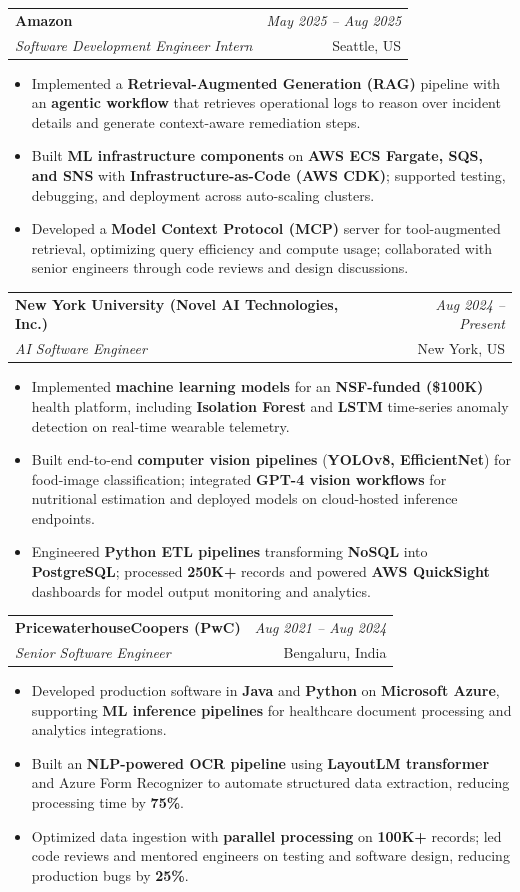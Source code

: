 \documentclass[a4paper,10pt]{article}
\makeatletter
\newcommand{\resumeSubheading}[4]{
\vspace{0.3mm}\item
    \begin{tabular*}{0.98\textwidth}[t]{l@{\extracolsep{\fill}}r}
        \textbf{#1} & \textit{\footnotesize{#4}} \\
        \textit{\footnotesize{#3}} & \footnotesize{#2}\\
    \end{tabular*}\vspace{-2mm}
}
\newcommand{\resumeItemListStart}{\begin{itemize}[leftmargin=*, labelsep=1mm, itemsep=0pt]}
\newcommand{\resumeItemListEnd}{\end{itemize}\vspace{-2mm}}
\makeatother
\begin{document}
\resumeSubheading
{Amazon}{Seattle, US}
{Software Development Engineer Intern}{May 2025 -- Aug 2025}
\resumeItemListStart
\item \footnotesize{Implemented a \textbf{Retrieval-Augmented Generation (RAG)} pipeline with an \textbf{agentic workflow} that retrieves operational logs to reason over incident details and generate context-aware remediation steps.}
\item \footnotesize{Built \textbf{ML infrastructure components} on \textbf{AWS ECS Fargate, SQS, and SNS} with \textbf{Infrastructure-as-Code (AWS CDK)}; supported testing, debugging, and deployment across auto-scaling clusters.}
\item \footnotesize{Developed a \textbf{Model Context Protocol (MCP)} server for tool-augmented retrieval, optimizing query efficiency and compute usage; collaborated with senior engineers through code reviews and design discussions.}
\resumeItemListEnd

\resumeSubheading
{New York University (Novel AI Technologies, Inc.)}{New York, US}
{AI Software Engineer}{Aug 2024 -- Present}
\resumeItemListStart
\item \footnotesize{Implemented \textbf{machine learning models} for an \textbf{NSF-funded (\$100K)} health platform, including \textbf{Isolation Forest} and \textbf{LSTM} time-series anomaly detection on real-time wearable telemetry.}
\item \footnotesize{Built end-to-end \textbf{computer vision pipelines} (\textbf{YOLOv8, EfficientNet}) for food-image classification; integrated \textbf{GPT-4 vision workflows} for nutritional estimation and deployed models on cloud-hosted inference endpoints.}
\item \footnotesize{Engineered \textbf{Python ETL pipelines} transforming \textbf{NoSQL} into \textbf{PostgreSQL}; processed \textbf{250K+} records and powered \textbf{AWS QuickSight} dashboards for model output monitoring and analytics.}
\resumeItemListEnd

\resumeSubheading
{PricewaterhouseCoopers (PwC)}{Bengaluru, India}
{Senior Software Engineer}{Aug 2021 -- Aug 2024}
\resumeItemListStart
\item \footnotesize{Developed production software in \textbf{Java} and \textbf{Python} on \textbf{Microsoft Azure}, supporting \textbf{ML inference pipelines} for healthcare document processing and analytics integrations.}
\item \footnotesize{Built an \textbf{NLP-powered OCR pipeline} using \textbf{LayoutLM transformer} and Azure Form Recognizer to automate structured data extraction, reducing processing time by \textbf{75\%}.}
\item \footnotesize{Optimized data ingestion with \textbf{parallel processing} on \textbf{100K+} records; led code reviews and mentored engineers on testing and software design, reducing production bugs by \textbf{25\%}.}
\resumeItemListEnd
\end{document}
